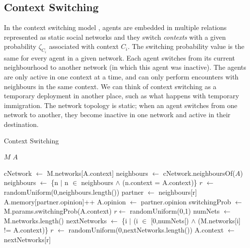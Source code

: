 \documentclass[preprint,number]{elsarticle}
\begin{document}
	
	\subsection{Context Switching}
	\label{sec:models_cs}
\noindent In the context switching model \cite{Antunes2009}, agents are embedded in multiple relations represented as static social networks and they switch \textit{contexts} with a given probability $\zeta_{C_i}$ associated with context $C_i$. The switching probability value is the same for every agent in a given network.  Each agent switches from its current neighbourhood to another network (in which this agent was inactive). The agents are only active in one context at a time, and can only perform encounters with neighbours in the same context. We can think of context switching as a temporary deployment in another place, such as what happens with temporary immigration. The network topology is static; when an agent switches from one network to another, they become inactive in one network and active in their destination. 
	\begin{algorithm}[H]
		\caption{Context Switching}
		\label{model:context_switching}
		\begin{algorithmic}
			\vspace{0.5em}
			\STATE $M$ 
			\STATE $A$ 
			\\ \hrulefill 
			
			\STATE{}
			\STATE cNetwork $\leftarrow$ M.networks[A.context]
			\STATE 
			\STATE {}
			\STATE neighbours $\leftarrow$ cNetwork.neighboursOf($A$) 
			\STATE {}
			\STATE neighbours $\leftarrow$ \{n $|$ n $\in$ neighbours $\wedge$ (n.context = A.context)\}
			\STATE
			\STATE{} 
			\STATE $r$ $\leftarrow$ randomUniform(0,neighbours.length())
			\STATE partner $\leftarrow$ neighbours[r]
			\STATE
			\STATE {}
			\STATE {}
			\STATE A.memory[partner.opinion]++
			\STATE A.opinion $\leftarrow$ partner.opinion
			\ENDIF
			\STATE
			\STATE {}
			\STATE switchingProb $\leftarrow$ M.params.switchingProb(A.context)
			\STATE $r \leftarrow $ randomUniform(0,1)
			\STATE numNets $\leftarrow$ M.networks.length()
			\STATE nextNetworks $\leftarrow$ \{i $|$ (i $\in$ [0,numNets[) $\wedge$ (M.networks[i] != A.context)\}
			\STATE $r$ $\leftarrow$ randomUniform(0,nextNetworks.length())
			\STATE A.context $\leftarrow$ nextNetworks[r]
			\ENDIF
		\end{algorithmic}
	\end{algorithm}
\end{document}
